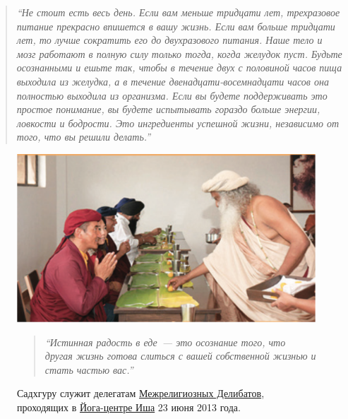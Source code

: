 \begin{quote}
\textit{``Не стоит есть весь день. Если вам меньше тридцати лет, трехразовое питание прекрасно впишется в вашу жизнь. Если вам больше тридцати лет, то лучше сократить его до двухразового питания. Наше тело и мозг работают в полную силу только тогда, когда желудок пуст. Будьте осознанными и ешьте так, чтобы в течение двух с половиной часов пища выходила из желудка, а в течение двенадцати-восемнадцати часов она полностью выходила из организма. Если вы будете поддерживать это простое понимание, вы будете испытывать гораздо больше энергии, ловкости и бодрости. Это ингредиенты успешной жизни, независимо от того, что вы решили делать.''
\\[5pt]
}
\end{quote}

\begin{figure}
    \centering
    \includegraphics[width=\textwidth]{img/deligates.png}
\begin{quote}\small
\textit{``Истинная радость в еде~--- это осознание того, что другая жизнь готова слиться с вашей собственной жизнью и стать частью вас.''
\\[5pt]
}
\end{quote}
    \caption{Садхгуру служит делегатам \href{http://blog.ishafoundation.org/inside-isha/happenings/celebrations-of-the-14th-anniversary-of-dhyanalinga-consecration/}{Межрелигиозных Делибатов}, проходящих в \href{http://blog.ishafoundation.org/inside-isha/happenings/celebrations-of-the-14th-anniversary-of-dhyanalinga-consecration/}{Йога-центре Иша} 23 июня 2013 года.
    }

\end{figure}


